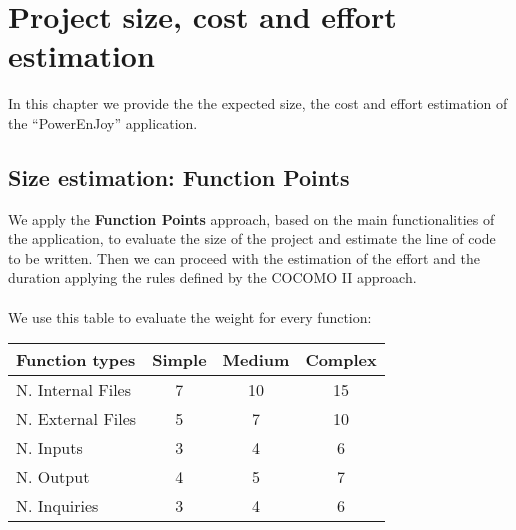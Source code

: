 \pagebreak
\section{Project size, cost and effort estimation}

In this chapter we provide the the expected size, the cost and effort estimation of the ``PowerEnJoy'' application.

\subsection{Size estimation: Function Points}

We apply the \textbf{Function Points} approach, based on the main functionalities of the application, to evaluate the size of the project and estimate the line of code to be written. Then  we can proceed with the estimation of the effort and the duration applying the rules defined by the COCOMO II approach. \\
\\
We use this table to evaluate the weight for every function:

\begin{center}
	\begin{tabular}{|l|c|c|c|}
		\hline
		\textbf{Function types} 	& \textbf{Simple} 	& \textbf{Medium} 	& \textbf{Complex} \\
		\hline \hline
		N. Internal Files 	& 7 	& 10 	& 15 \\
		\hline
		N. External Files 	& 5 	& 7 	& 10 \\
		\hline
		N. Inputs 	& 3 	& 4 	& 6 \\
		\hline
		N. Output 	& 4 	& 5 	& 7 \\
		\hline
		N. Inquiries 	& 3 	& 4 	& 6 \\	
		\hline
	\end{tabular}
\end{center}

